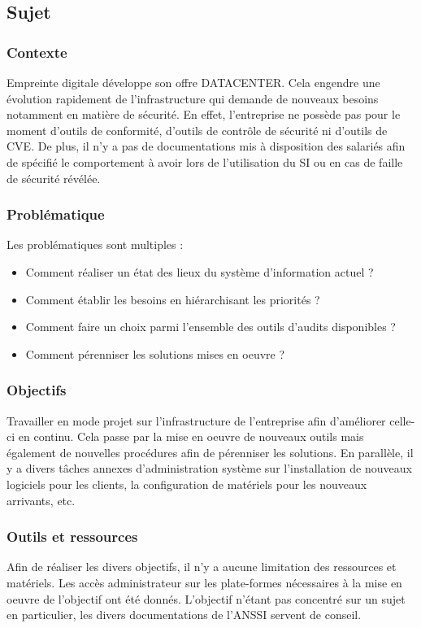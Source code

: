 \documentclass[12pt]{article}
\begin{document}
\subsection{Sujet}
\subsubsection{Contexte}
Empreinte digitale développe son offre DATACENTER. 
Cela engendre une évolution rapidement de l'infrastructure qui demande de nouveaux besoins notamment en matière de sécurité. 
En effet, l'entreprise ne possède pas pour le moment d'outils de conformité, d'outils de contrôle de sécurité ni d'outils de \gls{CVE}. 
De plus, il n'y a pas de documentations mis à disposition des salariés afin de spécifié le comportement à avoir lors de l'utilisation du SI ou en cas de faille de sécurité révélée.

\subsubsection{Problématique}
Les problématiques sont multiples :
\begin{itemize}
    \item Comment réaliser un état des lieux du système d'information actuel ?
    \item Comment établir les besoins en hiérarchisant les priorités ?
    \item Comment faire un choix parmi l'ensemble des outils d'audits disponibles ?
    \item Comment pérenniser les solutions mises en oeuvre ? 
\end{itemize}

\subsubsection{Objectifs}
Travailler en mode projet sur l'infrastructure de l'entreprise afin d'améliorer celle-ci en continu. 
Cela passe par la mise en oeuvre de nouveaux outils mais également de nouvelles procédures afin de pérenniser les solutions. 
En parallèle, il y a divers tâches annexes d'administration système sur l'installation de nouveaux logiciels pour les clients, la configuration de matériels pour les nouveaux arrivants, etc.

\subsubsection{Outils et ressources}
Afin de réaliser les divers objectifs, il n'y a aucune limitation des ressources et matériels. 
Les accès administrateur sur les plate-formes nécessaires à la mise en oeuvre de l'objectif ont été donnés. 
L'objectif n'étant pas concentré sur un sujet en particulier, les divers documentations de l'ANSSI servent de conseil.
\end{document}

